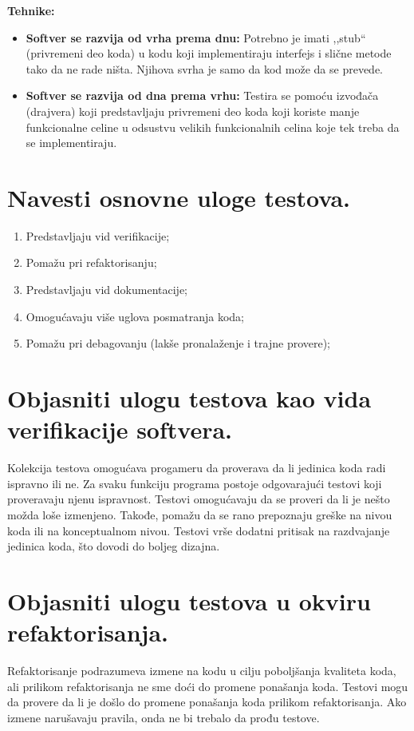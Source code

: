 \documentclass[a4paper]{article}
\begin{document}
  \noindent \textbf{Tehnike:}
  \begin{itemize}
    \item \textbf{Softver se razvija od vrha prema dnu:} Potrebno je imati ,,stub`` (privremeni deo 
          koda) u kodu koji implementiraju interfejs i slične metode tako da ne rade ništa. Njihova
          svrha je samo da kod može da se prevede. 
    \item \textbf{Softver se razvija od dna prema vrhu:} Testira se pomoću izvođača (drajvera) koji
          predstavljaju privremeni deo koda koji koriste manje funkcionalne celine u odsustvu
          velikih funkcionalnih celina koje tek treba da se implementiraju.
  \end{itemize}

\section{Navesti osnovne uloge testova.}
  \begin{enumerate}
    \item Predstavljaju vid verifikacije;
    \item Pomažu pri refaktorisanju;
    \item Predstavljaju vid dokumentacije;
    \item Omogućavaju više uglova posmatranja koda;
    \item Pomažu pri debagovanju (lakše pronalaženje i trajne provere);
  \end{enumerate}

\section{Objasniti ulogu testova kao vida verifikacije softvera.}
  Kolekcija testova omogućava progameru da proverava da li jedinica koda radi ispravno ili ne.
  Za svaku funkciju programa postoje odgovarajući testovi koji proveravaju njenu ispravnost. 
  Testovi omogućavaju da se proveri da li je nešto možda loše izmenjeno. Takođe, pomažu da se rano
  prepoznaju greške na nivou koda ili na konceptualnom nivou. Testovi vrše dodatni pritisak
  na razdvajanje jedinica koda, što dovodi do boljeg dizajna. 

\section{Objasniti ulogu testova u okviru refaktorisanja.}
  Refaktorisanje podrazumeva izmene na kodu u cilju poboljšanja kvaliteta koda, ali
  prilikom refaktorisanja ne sme doći do promene ponašanja koda. Testovi mogu da provere
  da li je došlo do promene ponašanja koda prilikom refaktorisanja. Ako izmene narušavaju
  pravila, onda ne bi trebalo da prođu testove.
\end{document}
